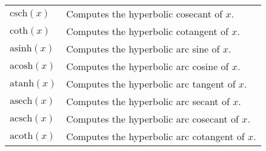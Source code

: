 \documentclass[10pt]{article}
\begin{document}
\begin{longtable}{p{}p{}}
        $ \mathrm{csch}(x) $                       & Computes the hyperbolic cosecant of $ x $. \\
        $ \mathrm{coth}(x) $                       & Computes the hyperbolic cotangent of $ x $. \\
        $ \mathrm{asinh}(x) $                      & Computes the hyperbolic arc sine of $ x $. \\
        $ \mathrm{acosh}(x) $                      & Computes the hyperbolic arc cosine of $ x $. \\
        $ \mathrm{atanh}(x) $                      & Computes the hyperbolic arc tangent of $ x $. \\
        $ \mathrm{asech}(x) $                      & Computes the hyperbolic arc secant of $ x $. \\
        $ \mathrm{acsch}(x) $                      & Computes the hyperbolic arc cosecant of $ x $. \\
        $ \mathrm{acoth}(x) $                      & Computes the hyperbolic arc cotangent of $ x $. \\
    \end{longtable}
    
\end{document}
